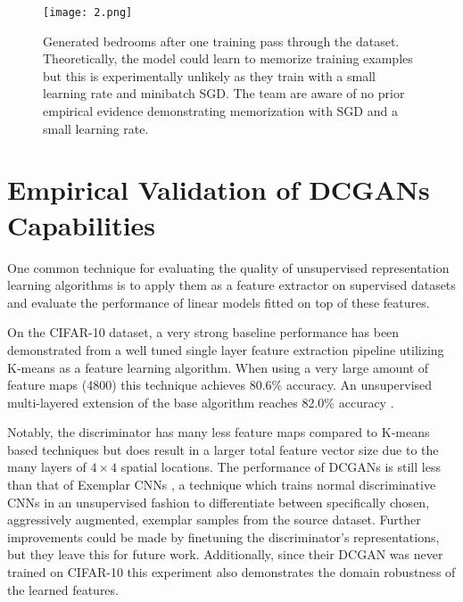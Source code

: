 \documentclass[10pt,twocolumn,letterpaper]{article}
\begin{document}
\begin{figure*}
	\begin{center}
		\texttt{[image: 2.png]}
	\end{center}
	\caption{Generated bedrooms after one training pass through the dataset. Theoretically, the model could learn to memorize training examples but this is experimentally unlikely as they train with a small learning rate and minibatch SGD. The team are aware of no prior empirical evidence demonstrating memorization with SGD and a small learning rate.}
	\label{fig:2}
\end{figure*}

\section{Empirical Validation of DCGANs Capabilities}

One common technique for evaluating the quality of unsupervised representation learning algorithms is to apply them as a feature extractor on supervised datasets and evaluate the performance of linear models fitted on top of these features. 

On the CIFAR-10 dataset, a very strong baseline performance has been demonstrated from a well tuned single layer feature extraction pipeline utilizing K-means as a feature learning algorithm. When using a very large amount of feature maps (4800) this technique achieves 80.6\% accuracy. An unsupervised multi-layered extension of the base algorithm reaches 82.0\% accuracy \cite{Coates2011Selecting}.

Notably, the discriminator has many less feature maps compared to K-means based techniques but does result in a larger total feature vector size due to the many layers of $4\times 4$ spatial locations. The performance of DCGANs is still less than that of Exemplar CNNs \cite{Dosovitskiy2014Discriminative}, a technique which trains normal discriminative CNNs in an unsupervised fashion to differentiate between specifically chosen, aggressively augmented, exemplar samples from the source dataset. Further improvements could be made by finetuning the discriminator's representations, but they leave this for future work. Additionally, since their DCGAN was never trained on CIFAR-10 this experiment also demonstrates the domain robustness of the learned features.
\end{document}
